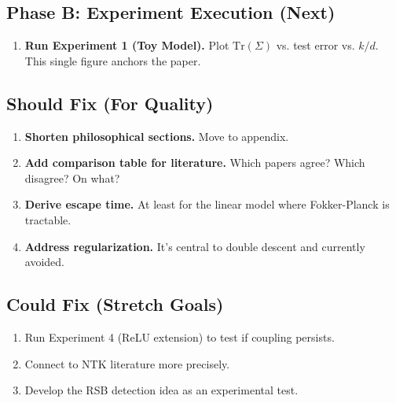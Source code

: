 \documentclass[11pt]{article}
\begin{document}
\subsection{Phase B: Experiment Execution (Next)}

\begin{enumerate}[label=\textbf{EX\arabic*.}]
    \item \textbf{Run Experiment 1 (Toy Model).} Plot $\mathrm{Tr}(\Sigma)$ vs. test error vs. $k/d$. This single figure anchors the paper.
\end{enumerate}

\subsection{Should Fix (For Quality)}

\begin{enumerate}[label=\textbf{SF\arabic*.}]
    \item \textbf{Shorten philosophical sections.} Move to appendix.
    
    \item \textbf{Add comparison table for literature.} Which papers agree? Which disagree? On what?
    
    \item \textbf{Derive escape time.} At least for the linear model where Fokker-Planck is tractable.
    
    \item \textbf{Address regularization.} It's central to double descent and currently avoided.
\end{enumerate}

\subsection{Could Fix (Stretch Goals)}

\begin{enumerate}[label=\textbf{CF\arabic*.}]
    \item Run Experiment 4 (ReLU extension) to test if coupling persists.
    
    \item Connect to NTK literature more precisely.
    
    \item Develop the RSB detection idea as an experimental test.
\end{enumerate}

\end{document}
